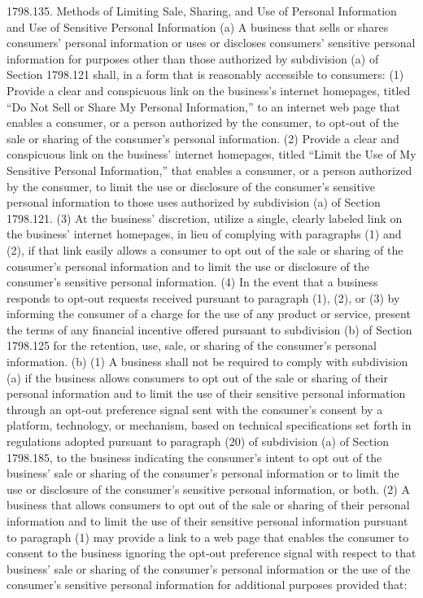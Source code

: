 1798.135.  Methods of Limiting Sale, Sharing, and Use of Personal Information and Use of Sensitive Personal Information
(a) A business that sells or shares consumers’ personal information or uses or discloses consumers’ sensitive personal information for purposes other than those authorized by subdivision (a) of Section 1798.121 shall, in a form that is reasonably accessible to consumers:
(1) Provide a clear and conspicuous link on the business’s internet homepages, titled “Do Not Sell or Share My Personal Information,” to an internet web page that enables a consumer, or a person authorized by the consumer, to opt-out of the sale or sharing of the consumer’s personal information.
(2) Provide a clear and conspicuous link on the business’ internet homepages, titled “Limit the Use of My Sensitive Personal Information,” that enables a consumer, or a person authorized by the consumer, to limit the use or disclosure of the consumer’s sensitive personal information to those uses authorized by subdivision (a) of Section 1798.121.
(3) At the business’ discretion, utilize a single, clearly labeled link on the business’ internet homepages, in lieu of complying with paragraphs (1) and (2), if that link easily allows a consumer to opt out of the sale or sharing of the consumer’s personal information and to limit the use or disclosure of the consumer’s sensitive personal information.
(4) In the event that a business responds to opt-out requests received pursuant to paragraph (1), (2), or (3) by informing the consumer of a charge for the use of any product or service, present the terms of any financial incentive offered pursuant to subdivision (b) of Section 1798.125 for the retention, use, sale, or sharing of the consumer’s personal information.
(b) (1) A business shall not be required to comply with subdivision (a) if the business allows consumers to opt out of the sale or sharing of their personal information and to limit the use of their sensitive personal information through an opt-out preference signal sent with the consumer’s consent by a platform, technology, or mechanism, based on technical specifications set forth in regulations adopted pursuant to paragraph (20) of subdivision (a) of Section 1798.185, to the business indicating the consumer’s intent to opt out of the business’ sale or sharing of the consumer’s personal information or to limit the use or disclosure of the consumer’s sensitive personal information, or both.
(2) A business that allows consumers to opt out of the sale or sharing of their personal information and to limit the use of their sensitive personal information pursuant to paragraph (1) may provide a link to a web page that enables the consumer to consent to the business ignoring the opt-out preference signal with respect to that business’ sale or sharing of the consumer’s personal information or the use of the consumer’s sensitive personal information for additional purposes provided that:

